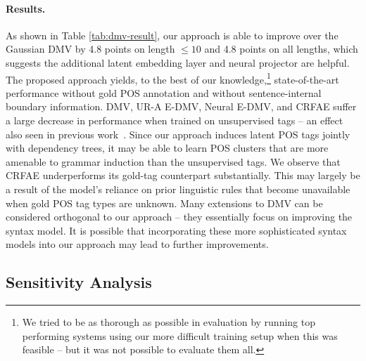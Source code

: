 \documentclass[11pt,a4paper]{article}
\begin{document}
\paragraph{Results.}
As shown in Table \ref{tab:dmv-result}, our approach is able to improve over the Gaussian DMV by 4.8 points on length $\leqslant 10$ and 4.8 points on all lengths, which suggests the additional latent embedding layer and neural projector are helpful. The proposed approach yields, to the best of our knowledge,\footnote{We tried to be as thorough as possible in evaluation by running top performing systems using our more difficult training setup when this was feasible -- but it was not possible to evaluate them all.} state-of-the-art performance without gold POS annotation and without sentence-internal boundary information. DMV, UR-A E-DMV, Neural E-DMV, and CRFAE suffer a large decrease in performance when trained on unsupervised tags -- an effect also seen in previous work~\citep{spitkovsky2011unsupervised, cohen2011unsupervised}. Since our approach induces latent POS tags jointly with dependency trees, it may be able to learn POS clusters that are more amenable to grammar induction than the unsupervised tags. We observe that CRFAE underperforms its gold-tag counterpart substantially. This may largely be a result of the model's reliance on prior linguistic rules that become unavailable when gold POS tag types are unknown. 
Many extensions to DMV can be considered orthogonal to our approach -- they essentially focus on improving the syntax model.
It is possible that incorporating these more sophisticated syntax models into our approach may lead to further improvements. 


\subsection{Sensitivity Analysis}
\end{document}
